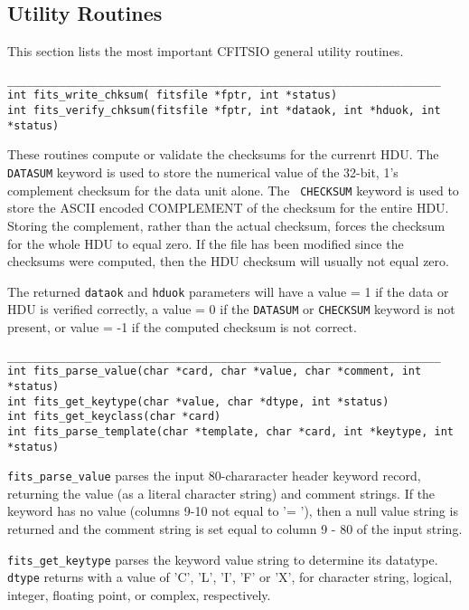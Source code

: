 \documentclass[11pt]{article}
\begin{document}
\subsection{Utility Routines}

This section lists the most important CFITSIO general utility routines.

\begin{verbatim}
___________________________________________________________________
int fits_write_chksum( fitsfile *fptr, int *status)
int fits_verify_chksum(fitsfile *fptr, int *dataok, int *hduok, int *status)
\end{verbatim}

These routines  compute or validate the checksums for the currenrt
HDU.  The {\tt DATASUM} keyword is used to store the numerical value of
the 32-bit, 1's complement checksum for the data unit alone.  The {\tt
CHECKSUM} keyword is used to store the ASCII encoded COMPLEMENT of the
checksum for the entire HDU.  Storing the complement, rather than the
actual checksum, forces the checksum for the whole HDU to equal zero.
If the file has been modified since the checksums were computed, then
the HDU checksum will usually not equal zero.

The returned {\tt dataok} and {\tt hduok} parameters will have a value
= 1 if the data or HDU is verified correctly, a value = 0 if the
{\tt DATASUM} or {\tt CHECKSUM} keyword is not present, or value = -1 if the
computed checksum is not correct.


\begin{verbatim}
___________________________________________________________________
int fits_parse_value(char *card, char *value, char *comment, int *status)
int fits_get_keytype(char *value, char *dtype, int *status)
int fits_get_keyclass(char *card)
int fits_parse_template(char *template, char *card, int *keytype, int *status)

\end{verbatim}

{\tt fits\_parse\_value} parses the input 80-chararacter header keyword record, returning
the value (as a literal character string) and comment strings.  If the
keyword has no value (columns 9-10 not equal to '= '), then a null
value string is returned and the comment string is set equal to column
9 - 80 of the input string.

{\tt fits\_get\_keytype} parses the keyword value string to determine its
datatype.  {\tt dtype} returns with a value of 'C', 'L', 'I', 'F' or
'X', for character string, logical, integer, floating point, or
complex, respectively.
\end{document}
